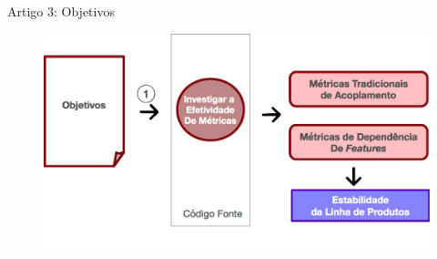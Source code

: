 \begin{frame}[t, fragile]{Artigo 3: Objetivos}        
  \begin{figure}[hbt]
    \includegraphics[scale=0.4]{imagens/artigo3-objetivos.jpg}
  \end{figure}
\end{frame}